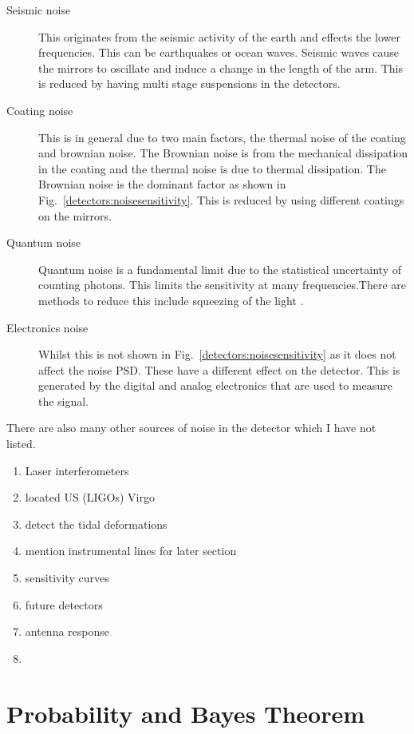 \begin{description}
\item[Seismic noise] This originates from the seismic activity of the earth and effects the lower frequencies. This can be earthquakes or ocean waves. Seismic waves cause the mirrors to oscillate and induce a change in the length of the arm. This is reduced by having multi stage suspensions in the detectors.

\item[Coating noise] This is in general due to two main factors, the thermal noise of the coating and brownian noise. The Brownian noise is from the mechanical dissipation in the coating and the thermal noise is due to thermal dissipation. The Brownian noise is the dominant factor as shown in Fig.~\ref{detectors:noisesensitivity}. This is reduced by using different coatings on the mirrors.

\item[Quantum noise] Quantum noise is a fundamental limit due to the statistical uncertainty of counting photons. This limits the sensitivity at many frequencies.There are methods to reduce this include squeezing of the light \citep{}. 

\item[Electronics noise] Whilst this is not shown in Fig.~\ref{detectors:noisesensitivity} as it does not affect the noise \ac{PSD}. These have a different effect on the detector. This is generated by the digital and analog electronics that are used to measure the signal. 
\end{description}

There are also many other sources of noise in the detector which I have not listed. 

\begin{enumerate}
    \item Laser interferometers
    \item located US (LIGOs) Virgo
    \item detect the tidal deformations 
    \item mention instrumental lines for later section
    \item sensitivity curves
    \item future detectors
    \item antenna response
    \item 
\end{enumerate}

\section{\label{intro:prob}Probability and Bayes Theorem}


